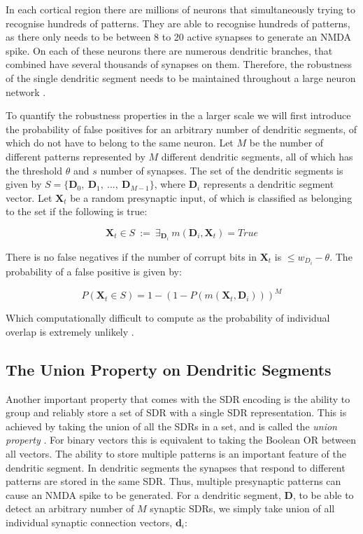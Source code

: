 In each cortical region there are millions of neurons that simultaneously trying to recognise hundreds of patterns. They are able to recognise hundreds of patterns, as there only needs to be between 8 to 20 active synapses to generate an NMDA spike. On each of these neurons there are numerous dendritic branches, that combined have several thousands of synapses on them. Therefore, the robustness of the single dendritic segment needs to be maintained throughout a large neuron network \cite{DBLP:journals/corr/AhmadH16}. 


To quantify the robustness properties in the a larger scale we will first introduce the probability of false positives for an arbitrary number of dendritic segments, of which do not have to belong to the same neuron. Let $M$ be the number of different patterns represented by $M$ different dendritic segments, all of which has the threshold $\theta$ and $s$ number of synapses. The set of the dendritic segments is given by $S = \{ \boldsymbol{D}_0,\ \boldsymbol{D}_1,\ ...,\ \boldsymbol{D}_{M-1}  \}$, where $\boldsymbol{D}_i$ represents a dendritic segment vector. Let $\boldsymbol{X}_t$ be a random presynaptic input, of which is classified as belonging to the set if the following is true:


\begin{equation}
    \boldsymbol{X}_t \in S\ :=\ \exists_{\boldsymbol{D}_i}\ m(\boldsymbol{D}_i, \boldsymbol{X}_t) = True
\end{equation}


There is no false negatives if the number of corrupt bits in $\boldsymbol{X}_t$ is $\leq w_{D_i} - \theta$. The probability of a false positive is given by:

\begin{equation}
    P(\boldsymbol{X}_t \in S) = 1 - (1-P(m(\boldsymbol{X}_t, \boldsymbol{D}_i)))^M
\end{equation}

Which computationally difficult to compute as the probability of individual overlap is extremely unlikely \cite{DBLP:journals/corr/AhmadH16}.

\subsection{The Union Property on Dendritic Segments}
Another important property that comes with the SDR encoding is the ability to group and reliably store a set of SDR with a single SDR representation. This is achieved by taking the union of all the SDRs in a set, and is called the \textit{union property} \cite{DBLP:journals/corr/AhmadH16}. For binary vectors this is equivalent to taking the Boolean OR between all vectors. The ability to store multiple patterns is an important feature of the dendritic segment. In dendritic segments the synapses that respond to different patterns are stored in the same SDR. Thus, multiple presynaptic patterns can cause an NMDA spike to be generated. For a dendritic segment, $\boldsymbol{D}$, to be able to detect an arbitrary number of $M$ synaptic SDRs, we simply take union of all individual synaptic connection vectors, $\boldsymbol{d}_i$:

